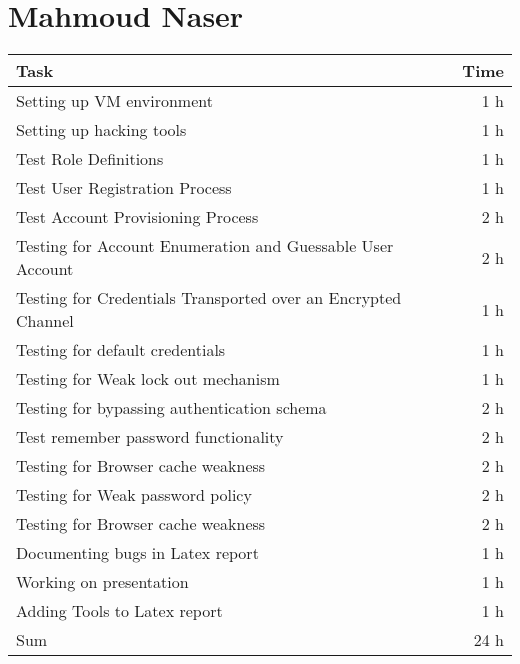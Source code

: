 \section*{Mahmoud Naser}
\begin{table}[h!tpb]
  \centering
  \begin{tabularx}{\textwidth}{X r}
    \toprule
      Task & Time \\
    \midrule
      Setting up VM environment & 1 h \\
      Setting up hacking tools & 1 h \\

      Test Role Definitions & 1 h \\
      Test User Registration Process & 1 h \\
      Test Account Provisioning Process & 2 h \\
      Testing for Account Enumeration and Guessable User Account & 2 h \\

      Testing for Credentials Transported over an Encrypted Channel & 1 h \\
      Testing for default credentials & 1 h \\
      Testing for Weak lock out mechanism & 1 h \\
      Testing for bypassing authentication schema & 2 h \\
      Test remember password functionality & 2 h \\
      Testing for Browser cache weakness & 2 h \\
      Testing for Weak password policy & 2 h \\
      Testing for Browser cache weakness & 2 h \\

      Documenting bugs in Latex report & 1 h \\
      Working on presentation & 1 h \\
      Adding Tools to Latex report & 1 h \\
            
    \midrule
      Sum & 24 h \\
    \bottomrule
  \end{tabularx}
\end{table}
